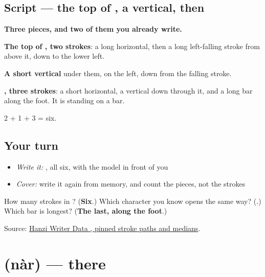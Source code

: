\subsection*{Script — the top of , a vertical, then }

\begin{quote}
\end{quote}

\textbf{Three pieces, and two of them you already write.}

\textbf{The top of , two strokes}: a long horizontal, then a long left-falling stroke from above it, down to the lower left.

\textbf{A short vertical} under them, on the left, down from the falling stroke.

\textbf{, three strokes}: a short horizontal, a vertical down through it, and a long bar along the foot. It is  standing on a bar.

2 + 1 + 3 = six.

\subsection*{Your turn}
\begin{itemize}
\raggedright
  \item \emph{Write it:} , all six, with the model in front of you
  \item \emph{Cover:} write it again from memory, and count the pieces, not the strokes
\end{itemize}

\begin{tcolorbox}[breakable,colback=teal!4,colframe=teal!35!black,title={Before you move on}]
How many strokes in ? (\textbf{Six}.) Which character you know opens the same way? (\textbf{}.) Which bar is longest? (\textbf{The last, along the foot}.)

Source: \href{https://raw.githubusercontent.com/chanind/hanzi-writer-data/68d10a4b21150cae5e1ebbd223eed289cf32d90c/data/\%E5\%9C\%A8.json}{Hanzi Writer Data , pinned stroke paths and medians}.
\end{tcolorbox}
\section[\texorpdfstring{\zh{那儿} (nàr)}{那儿 (nàr)}]{ (nàr) — there}


